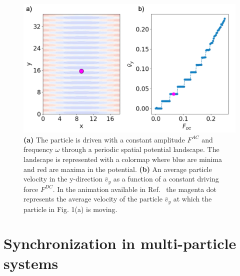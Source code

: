 \documentclass[twocolumn,preprintnumbers,amsmath,amssymb,aps,prx]{revtex4}
\begin{document}
\begin{center}
\begin{figure}[h!]
\centering
\includegraphics[width=\columnwidth]{single}
\caption{\textbf{(a)} The particle is driven with a constant amplitude $F^{AC}$ and frequency $\omega$ through a periodic spatial potential landscape.  The landscape is represented with a colormap where blue are minima and red are maxima in the potential. \textbf{(b)} An average particle velocity in the y-direction $\bar{v}_{y}$ as a function of a constant driving force $F^{DC}$. In the animation available in Ref.~\cite{supp1} the magenta dot represents the average velocity of the particle $\bar{v}_{y}$ at which the particle in Fig. 1(a) is moving.}
\label{fig:1}
\end{figure}
\end{center}

\section{Synchronization in multi-particle systems}
\label{sec:sync}
\end{document}
